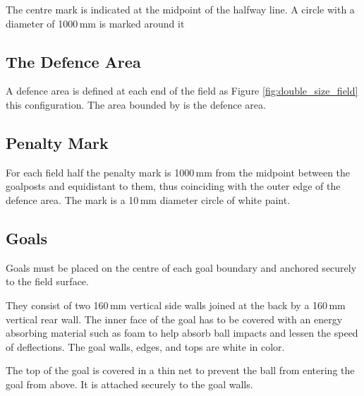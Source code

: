 The centre mark is indicated at the midpoint of the halfway line.
A  circle  with  a  diameter  of 1000\,mm is marked around it 

\subsection{The Defence Area}

A defence area is defined at each end of the field as 
  Figure \ref{fig:double_size_field}  this configuration.
The area bounded by  is
the defence area.


\subsection{Penalty Mark}
For each field half the penalty mark is
 1000\,mm  from the midpoint between the goalposts and equidistant to them, thus
coinciding with the outer edge of the defence area.
The mark is a 10\,mm diameter circle of white paint.

\subsection{Goals}
Goals must be placed on the centre of each goal boundary and anchored
securely to the field surface.

They consist of two 160\,mm vertical side walls joined at the back by a 160\,mm
vertical rear wall. The inner face of the goal has to be covered with an energy
absorbing material such as foam to help absorb ball impacts and lessen the speed
of deflections.
The goal walls, edges, and tops are white in color.

The top of the goal is covered in a thin net to prevent the ball
from entering the goal from above. It is attached securely to the 
goal walls.

